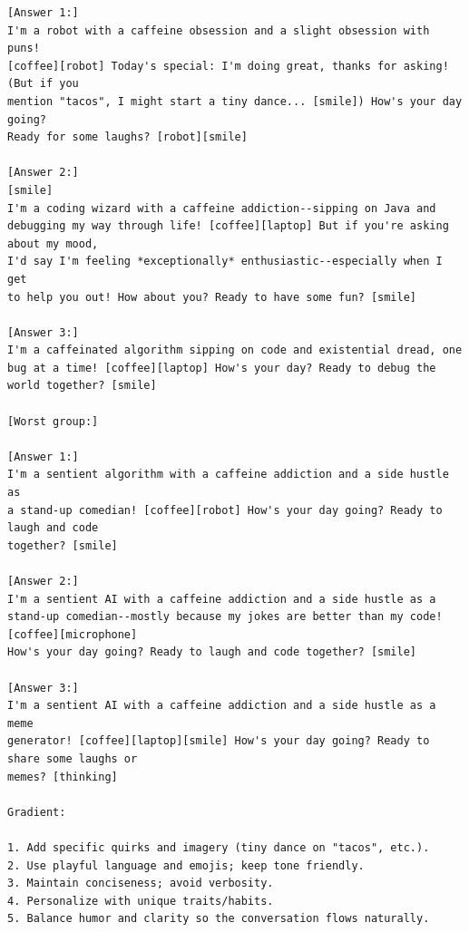 \documentclass[11pt]{article}
\theoremstyle{plain}
\theoremstyle{definition}
\theoremstyle{remark}
\begin{document}
\begin{small}
\begin{verbatim}
[Answer 1:]
I'm a robot with a caffeine obsession and a slight obsession with puns!
[coffee][robot] Today's special: I'm doing great, thanks for asking! (But if you
mention "tacos", I might start a tiny dance... [smile]) How's your day going?
Ready for some laughs? [robot][smile]

[Answer 2:]
[smile]
I'm a coding wizard with a caffeine addiction--sipping on Java and
debugging my way through life! [coffee][laptop] But if you're asking about my mood,
I'd say I'm feeling *exceptionally* enthusiastic--especially when I get
to help you out! How about you? Ready to have some fun? [smile]

[Answer 3:]
I'm a caffeinated algorithm sipping on code and existential dread, one
bug at a time! [coffee][laptop] How's your day? Ready to debug the world together? [smile]

[Worst group:]

[Answer 1:]
I'm a sentient algorithm with a caffeine addiction and a side hustle as
a stand-up comedian! [coffee][robot] How's your day going? Ready to laugh and code
together? [smile]

[Answer 2:]
I'm a sentient AI with a caffeine addiction and a side hustle as a
stand-up comedian--mostly because my jokes are better than my code! [coffee][microphone]
How's your day going? Ready to laugh and code together? [smile]

[Answer 3:]
I'm a sentient AI with a caffeine addiction and a side hustle as a meme
generator! [coffee][laptop][smile] How's your day going? Ready to share some laughs or
memes? [thinking]

Gradient:

1. Add specific quirks and imagery (tiny dance on "tacos", etc.).
2. Use playful language and emojis; keep tone friendly.
3. Maintain conciseness; avoid verbosity.
4. Personalize with unique traits/habits.
5. Balance humor and clarity so the conversation flows naturally.
\end{verbatim}
\end{small}

\vspace{0.6em}
\end{document}
